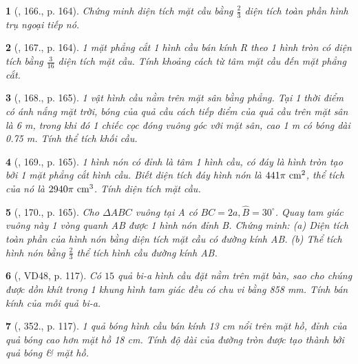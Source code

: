 \documentclass{article}
\newtheorem{baitoan}{}
\begin{document}
\begin{baitoan}[\cite{Tuyen_Toan_9_old}, 166., p. 164]
	Chứng minh diện tích mặt cầu bằng $\frac{2}{3}$ diện tích toàn phần hình trụ ngoại tiếp nó.
\end{baitoan}

\begin{baitoan}[\cite{Tuyen_Toan_9_old}, 167., p. 164]
	1 mặt phẳng cắt 1 hình cầu bán kính R theo 1 hình tròn có diện tích bằng $\frac{3}{16}$ diện tích mặt cầu. Tính khoảng cách từ tâm mặt cầu đến mặt phẳng cắt.
\end{baitoan}

\begin{baitoan}[\cite{Tuyen_Toan_9_old}, 168., p. 165]
	1 vật hình cầu nằm trên mặt sân bằng phẳng. Tại 1 thời điểm có ánh nắng mặt trời, bóng của quả cầu cách tiếp điểm của quả cầu trên mặt sân là {\rm6 m}, trong khi đó 1 chiếc cọc đóng vuông góc với mặt sân, cao {\rm1 m} có bóng dài {\rm0.75 m}. Tính thể tích khối cầu.
\end{baitoan}

\begin{baitoan}[\cite{Tuyen_Toan_9_old}, 169., p. 165]
	1 hình nón có đỉnh là tâm 1 hình cầu, có đáy là hình tròn tạo bởi 1 mặt phẳng cắt hình cầu. Biết diện tích đáy hình nón là $441\pi\ {\rm cm}^2$, thể tích của nó là $2940\pi\ {\rm cm}^3$. Tính diện tích mặt cầu.
\end{baitoan}

\begin{baitoan}[\cite{Tuyen_Toan_9_old}, 170., p. 165]
	Cho $\Delta ABC$ vuông tại A có $BC = 2a,\widehat{B} = 30^\circ$. Quay tam giác vuông này 1 vòng quanh AB được 1 hình nón đỉnh B. Chứng minh: (a) Diện tích toàn phần của hình nón bằng diện tích mặt cầu có đường kính AB. (b) Thể tích hình nón bằng $\frac{2}{3}$ thể tích hình cầu đường kính AB.
\end{baitoan}

\begin{baitoan}[\cite{Binh_Toan_9_tap_2}, VD48, p. 117]
	Có $15$ quả bi-a hình cầu đặt nằm trên mặt bàn, sao cho chúng được dồn khít trong 1 khung hình tam giác đều có chu vi bằng {\rm858 mm}. Tính bán kính của mỗi quả bi-a.
\end{baitoan}

\begin{baitoan}[\cite{Binh_Toan_9_tap_2}, 352., p. 117]
	1 quả bóng hình cầu bán kính {\rm13 cm} nổi trên mặt hồ, đỉnh của quả bóng cao hơn mặt hồ {\rm18 cm}. Tính độ dài của đường tròn được tạo thành bởi quả bóng \& mặt hồ.
\end{baitoan}
\end{document}
